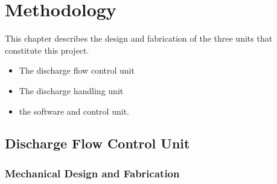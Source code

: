 \section{Methodology}
\par
This chapter describes the design and fabrication of the three units that constitute this project.
\begin{itemize}
    \item The discharge flow control unit
    \item The discharge handling unit
    \item the software and control unit.
\end{itemize}
\subsection{Discharge Flow Control Unit}

\subsubsection{Mechanical Design and Fabrication}

